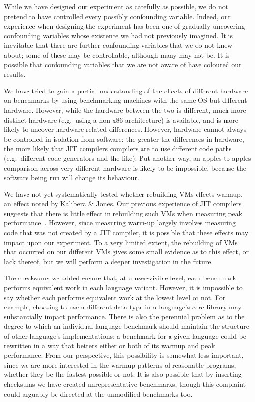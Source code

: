 \documentclass[a4paper,UKenglish]{lipics}
\newcommand{\kalibera}{Kalibera \& Jones\xspace}
\begin{document}
While we have designed our experiment as carefully as possible, we do not
pretend to have controlled every possibly confounding variable. Indeed, our
experience when designing the experiment has been one of gradually uncovering
confounding variables whose existence we had not previously imagined. It
is inevitable that there are further confounding variables that we
do not know about; some of these may be controllable, although many may not be.
It is possible that confounding variables that we are not aware of have
coloured our results.

We have tried to gain a partial understanding of the effects of different
hardware on benchmarks by using benchmarking machines with the same OS but
different hardware. However, while the hardware between the two is
different, much more distinct hardware (e.g.~using a non-x86 architecture) is
available, and is more likely to uncover hardware-related differences.
However, hardware cannot always be controlled in isolation from software:
the greater the differences in hardware, the more likely that JIT compilers
compilers are to use different code paths (e.g.~different code generators and
the like). Put another way, an apples-to-apples comparison across very different
hardware is likely to be impossible, because the software being run will
change its behaviour.

We have not yet systematically tested whether rebuilding VMs effects warmup, an
effect noted by \kalibera. Our previous experience of JIT compilers suggests
that there is little effect in rebuilding such VMs when measuring peak
performance~\cite{barrett15approaches}. However, since measuring warm-up largely
involves measuring code that was not created by a JIT compiler, it is possible
that these effects may impact upon our experiment. To a very limited extent, the
rebuilding of VMs that occurred on our different VMs gives some small evidence
as to this effect, or lack thereof, but we will perform a deeper investigation
in the future.

The checksums we added ensure that, at a user-visible level, each benchmark
performs equivalent work in each language variant. However, it is impossible to
say whether each performs equivalent work at the lowest level or not. For
example, choosing to use a different data type in a language's core library may
substantially impact performance. There is also the perennial problem as to the
degree to which an individual language benchmark should maintain the structure
of other language's implementations: a benchmark for a given language could be
rewritten in a way that betters either or both of its warmup and peak
performance. From our perspective, this possibility is somewhat less important,
since we are more interested in the warmup patterns of reasonable programs,
whether they be the fastest possible or not. It is also possible that by
inserting checksums we have created unrepresentative benchmarks, though
this complaint could arguably be directed at the unmodified benchmarks too.
\end{document}
